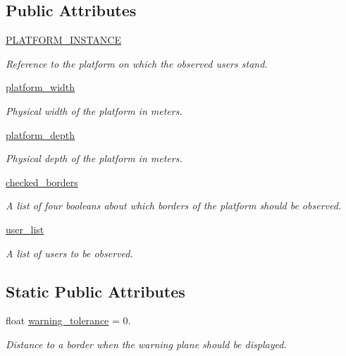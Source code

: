 \subsection*{\-Public \-Attributes}
\begin{DoxyCompactItemize}
\item 
\hyperlink{classlib_1_1BorderObserver_1_1BorderObserver_a965fa9bf7643ca61b36a65af599c703f}{\-P\-L\-A\-T\-F\-O\-R\-M\-\_\-\-I\-N\-S\-T\-A\-N\-C\-E}
\begin{DoxyCompactList}\small\item\em \-Reference to the platform on which the observed users stand. \end{DoxyCompactList}\item 
\hyperlink{classlib_1_1BorderObserver_1_1BorderObserver_ab3c3b586d967e89d21d2eb9c40eb155e}{platform\-\_\-width}
\begin{DoxyCompactList}\small\item\em \-Physical width of the platform in meters. \end{DoxyCompactList}\item 
\hyperlink{classlib_1_1BorderObserver_1_1BorderObserver_aff2968f9062237a68dacb5bd74a693db}{platform\-\_\-depth}
\begin{DoxyCompactList}\small\item\em \-Physical depth of the platform in meters. \end{DoxyCompactList}\item 
\hyperlink{classlib_1_1BorderObserver_1_1BorderObserver_a25ba74cce5dc46c522e75b5c92fc696c}{checked\-\_\-borders}
\begin{DoxyCompactList}\small\item\em \-A list of four booleans about which borders of the platform should be observed. \end{DoxyCompactList}\item 
\hyperlink{classlib_1_1BorderObserver_1_1BorderObserver_a99b5a746ff7a7a2c3cf3838253e9067c}{user\-\_\-list}
\begin{DoxyCompactList}\small\item\em \-A list of users to be observed. \end{DoxyCompactList}\end{DoxyCompactItemize}
\subsection*{\-Static \-Public \-Attributes}
\begin{DoxyCompactItemize}
\item 
float \hyperlink{classlib_1_1BorderObserver_1_1BorderObserver_a9521c87181073a5123559b5debf7238f}{warning\-\_\-tolerance} = 0.
\begin{DoxyCompactList}\small\item\em \-Distance to a border when the warning plane should be displayed. \end{DoxyCompactList}\end{DoxyCompactItemize}



